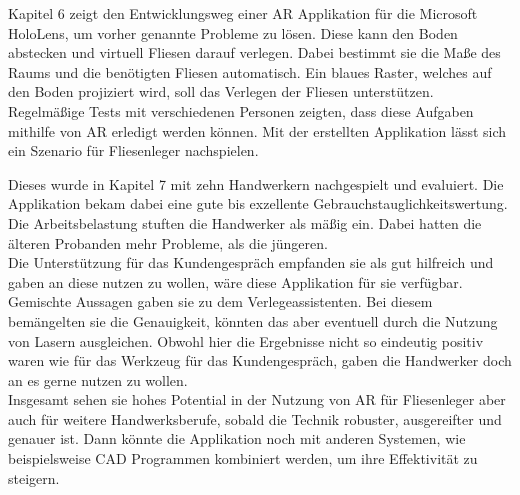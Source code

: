 Kapitel 6 zeigt den Entwicklungsweg einer AR Applikation für die Microsoft HoloLens, um vorher genannte Probleme zu lösen. Diese kann den Boden abstecken und virtuell Fliesen darauf verlegen. Dabei bestimmt sie die Maße des Raums und die benötigten Fliesen automatisch. Ein blaues Raster, welches auf den Boden projiziert wird, soll das Verlegen der Fliesen unterstützen. Regelmäßige Tests mit verschiedenen Personen zeigten, dass diese Aufgaben mithilfe von AR erledigt werden können. Mit der erstellten Applikation lässt sich ein Szenario für Fliesenleger nachspielen.

Dieses wurde in Kapitel 7 mit zehn Handwerkern nachgespielt und evaluiert. Die Applikation bekam dabei eine gute bis exzellente Gebrauchstauglichkeitswertung. Die Arbeitsbelastung stuften die Handwerker als mäßig ein. Dabei hatten die älteren Probanden mehr Probleme, als die jüngeren. \\
Die Unterstützung für das Kundengespräch empfanden sie als gut hilfreich und gaben an diese nutzen zu wollen, wäre diese Applikation für sie verfügbar. \\
Gemischte Aussagen gaben sie zu dem Verlegeassistenten. Bei diesem bemängelten sie die Genauigkeit, könnten das aber eventuell durch die Nutzung von Lasern ausgleichen. Obwohl hier die Ergebnisse nicht so eindeutig positiv waren wie für das Werkzeug für das Kundengespräch, gaben die Handwerker doch an es gerne nutzen zu wollen. \\
Insgesamt sehen sie hohes Potential in der Nutzung von AR für Fliesenleger aber auch für weitere Handwerksberufe, sobald die Technik robuster, ausgereifter und genauer ist. Dann könnte die Applikation noch mit anderen Systemen, wie beispielsweise CAD Programmen kombiniert werden, um ihre Effektivität zu steigern.